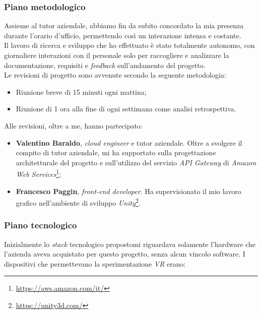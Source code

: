 \subsubsection{Piano metodologico}
	
Assieme al tutor aziendale, abbiamo fin da subito concordato la mia presenza durante l'orario d'ufficio, permettendo così un interazione intensa e costante. \\
Il lavoro di ricerca e sviluppo che ho effettuato è stato totalmente autonomo, con giornaliere interazioni con il personale solo per raccogliere e analizzare la documentazione, requisiti e \textit{feedback} sull'andamento del progetto. \\
Le revisioni di progetto sono avvenute secondo la seguente metodologia:

\begin{itemize}
	\item Riunione breve di 15 minuti ogni mattina;
	\item Riunione di 1 ora alla fine di ogni settimana come analisi retrospettiva.
\end{itemize}

Alle revisioni, oltre a me, hanno partecipato:

\begin{itemize}
	\item \textbf{Valentino Baraldo}, \textit{cloud engineer} e tutor aziendale. Oltre a svolgere il compito di tutor aziendale, mi ha supportato sulla progettazione architetturale del progetto e sull'utilizzo del servizio \textit{API Gateway} di \textit{Amazon Web Services}\footnote[1]{\url{https://aws.amazon.com/it/}};
	\item \textbf{Francesco Paggin}, \textit{front-end developer}. Ha supervisionato il mio lavoro grafico nell'ambiente di sviluppo \textit{Unity}\footnote[2]{\url{https://unity3d.com/}}.
\end{itemize}  

\subsubsection{Piano tecnologico}

Inizialmente lo \textit{stack} tecnologico propostomi riguardava solamente l'hardware che l'azienda aveva acquistato per questo progetto, senza alcun vincolo software. I dispositivi che permettevano la sperimentazione \textit{VR} erano:

